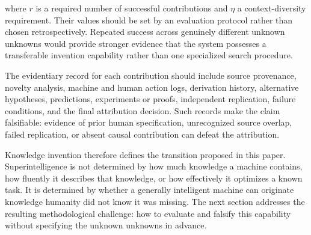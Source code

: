 where $r$ is a required number of successful contributions and $\eta$ a
context-diversity requirement. Their values should be set by an evaluation
protocol rather than chosen retrospectively. Repeated success across genuinely
different unknown unknowns would provide stronger evidence that the system
possesses a transferable invention capability rather than one specialized
search procedure.

The evidentiary record for each contribution should include source provenance,
novelty analysis, machine and human action logs, derivation history,
alternative hypotheses, predictions, experiments or proofs, independent
replication, failure conditions, and the final attribution decision. Such
records make the claim falsifiable: evidence of prior human specification,
unrecognized source overlap, failed replication, or absent causal contribution
can defeat the attribution.

Knowledge invention therefore defines the transition proposed in this paper.
Superintelligence is not determined by how much knowledge a machine contains,
how fluently it describes that knowledge, or how effectively it optimizes a
known task. It is determined by whether a generally intelligent machine can
originate knowledge humanity did not know it was missing. The next section
addresses the resulting methodological challenge: how to evaluate and falsify
this capability without specifying the unknown unknowns in advance.

